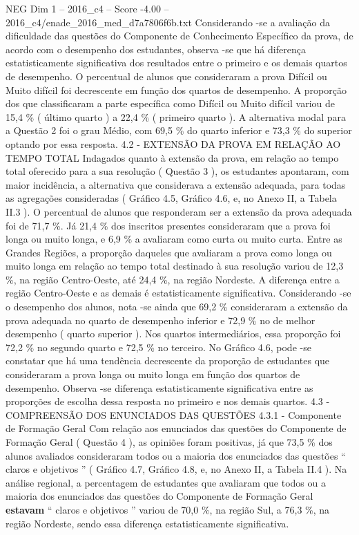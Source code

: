 \begin{textsample}{NEG Dim 1 – 2016\_c4 – Score -4.00 – 2016\_c4/enade\_2016\_med\_d7a7806f6b.txt}
Considerando -se a avaliação da dificuldade das questões do Componente de Conhecimento Específico da prova, de acordo com o desempenho dos estudantes, observa -se que há diferença estatisticamente significativa dos resultados entre o primeiro e os demais quartos de desempenho.
O percentual de alunos que consideraram a prova Difícil ou Muito difícil foi decrescente em função dos quartos de desempenho.
A proporção dos que classificaram a parte específica como Difícil ou Muito difícil variou de 15,4 \% ( último quarto ) a 22,4 \% ( primeiro quarto ).
A alternativa modal para a Questão 2 foi o grau Médio, com 69,5 \% do quarto inferior e 73,3 \% do superior optando por essa resposta. 4.2 - EXTENSÃO DA PROVA EM RELAÇÃO AO TEMPO TOTAL Indagados quanto à extensão da prova, em relação ao tempo total oferecido para a sua resolução ( Questão 3 ), os estudantes apontaram, com maior incidência, a alternativa que considerava a extensão adequada, para todas as agregações consideradas ( Gráfico 4.5, Gráfico 4.6, e, no Anexo II, a Tabela II.3 ).
O percentual de alunos que responderam ser a extensão da prova adequada foi de 71,7 \%.
Já 21,4 \% dos inscritos presentes consideraram que a prova foi longa ou muito longa, e 6,9 \% a avaliaram como curta ou muito curta.
Entre as Grandes Regiões, a proporção daqueles que avaliaram a prova como longa ou muito longa em relação ao tempo total destinado à sua resolução variou de 12,3 \%, na região Centro-Oeste, até 24,4 \%, na região Nordeste.
A diferença entre a região Centro-Oeste e as demais é estatisticamente significativa.
Considerando -se o desempenho dos alunos, nota -se ainda que 69,2 \% consideraram a extensão da prova adequada no quarto de desempenho inferior e 72,9 \% no de melhor desempenho ( quarto superior ).
Nos quartos intermediários, essa proporção foi 72,2 \% no segundo quarto e 72,5 \% no terceiro.
No Gráfico 4.6, pode -se constatar que há uma tendência decrescente da proporção de estudantes que consideraram a prova longa ou muito longa em função dos quartos de desempenho.
Observa -se diferença estatisticamente significativa entre as proporções de escolha dessa resposta no primeiro e nos demais quartos. 4.3 - COMPREENSÃO DOS ENUNCIADOS DAS QUESTÕES 4.3.1 - Componente de Formação Geral Com relação aos enunciados das questões do Componente de Formação Geral ( Questão 4 ), as opiniões foram positivas, já que 73,5 \% dos alunos avaliados consideraram todos ou a maioria dos enunciados das questões “ claros e objetivos ” ( Gráfico 4.7, Gráfico 4.8, e, no Anexo II, a Tabela II.4 ).
Na análise regional, a percentagem de estudantes que avaliaram que todos ou a maioria dos enunciados das questões do Componente de Formação Geral \textbf{estavam} “ claros e objetivos ” variou de 70,0 \%, na região Sul, a 76,3 \%, na região Nordeste, sendo essa diferença estatisticamente significativa.

\end{textsample}
